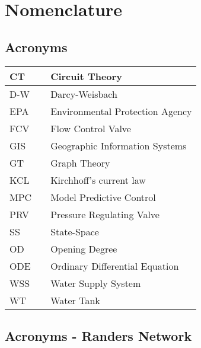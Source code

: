 \chapter{Nomenclature}

\section*{Acronyms}
	
	\begin{tabular}{|l c l|} \hline
		CT      &&	Circuit Theory									\\ \hline
		D-W     &&	Darcy-Weisbach									\\ \hline
		EPA     &&	Environmental Protection Agency					\\ \hline
		FCV     &&	Flow Control Valve								\\ \hline
		GIS     &&	Geographic Information Systems					\\ \hline
		GT      &&	Graph Theory									\\ \hline
		KCL     &&	Kirchhoff's current law							\\ \hline
		MPC 	&&	Model Predictive Control						\\ \hline		
		PRV     &&	Pressure Regulating Valve						\\ \hline
		SS      &&	State-Space										\\ \hline
		OD		&&	Opening Degree									\\ \hline
		ODE		&&	Ordinary Differential Equation					\\ \hline
		WSS 	&&	Water Supply System								\\ \hline
		WT  	&&	Water Tank										\\ \hline
	\end{tabular}

\section*{Acronyms - Randers Network}
	
